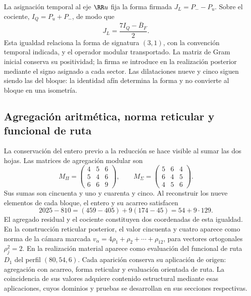 La asignación temporal al eje \(\RR u\) fija la forma firmada
\(J_L=P_--P_u\). Sobre el cociente, \(I_Q=P_u+P_-\), de modo que
\[
 J_L=\frac{7I_Q-\overline B_F}{2}.
\]
Esta igualdad relaciona la forma de signatura \((3,1)\), con la
convención temporal indicada, y el operador modular transportado. La
matriz de Gram inicial conserva su positividad; la firma se introduce
en la realización posterior mediante el signo asignado a cada sector.
Las dilataciones nueve y cinco siguen siendo las del bloque: la identidad
afín determina la forma y no convierte al bloque en una isometría.

\subsection{Agregación aritmética, norma reticular y funcional de ruta}
La conservación del entero previo a la reducción se hace visible al sumar
las dos hojas. Las matrices de agregación modular son
\[
 M_\Pi=\begin{pmatrix}4&5&6\\5&4&6\\6&6&9\end{pmatrix},\qquad
 M_\Sigma=\begin{pmatrix}5&6&4\\6&4&5\\4&5&6\end{pmatrix}.
\]
Sus sumas son cincuenta y uno y cuarenta y cinco. Al reconstruir los
nueve elementos de cada bloque, el entero y su acarreo satisfacen
\[
 2025-810=(459-405)+9(174-45)=54+9\cdot129.
\]
El agregado residual y el cociente constituyen dos coordenadas de esta
igualdad. En la construcción reticular posterior, el valor cincuenta y
cuatro aparece como norma de la cámara marcada
\(v_\alpha=4\rho_1+\rho_2+\cdots+\rho_{12}\), para vectores
ortogonales \(\rho_j^2=2\). En la realización material aparece como
evaluación del funcional de ruta \(D_1\) del perfil \((80,54,6)\).
Cada aparición conserva su aplicación de origen: agregación con acarreo,
forma reticular y evaluación orientada de ruta. La coincidencia de sus
valores adquiere contenido estructural mediante esas aplicaciones, cuyos
dominios y pruebas se desarrollan en sus secciones respectivas.
